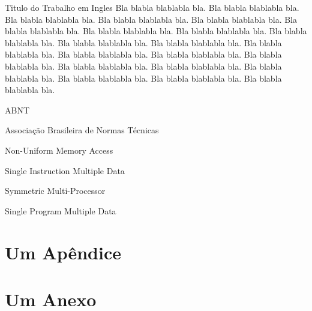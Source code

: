 \documentclass[tese,capa]{texufpel}
\begin{document}
\begin{englishabstract}{Titulo do Trabalho em Ingles}
Bla blabla blablabla bla.  Bla blabla blablabla bla.  Bla blabla
blablabla bla.  Bla blabla blablabla bla.  Bla blabla blablabla bla.
Bla blabla blablabla bla.  Bla blabla blablabla bla.  Bla blabla
blablabla bla.  Bla blabla blablabla bla.  Bla blabla blablabla bla.
Bla blabla blablabla bla.  Bla blabla blablabla bla.  Bla blabla
blablabla bla.  Bla blabla blablabla bla.  Bla blabla blablabla bla.
Bla blabla blablabla bla.  Bla blabla blablabla bla.  Bla blabla
blablabla bla.  Bla blabla blablabla bla.  Bla blabla blablabla bla.
Bla blabla blablabla bla.
\end{englishabstract}

\listoffigures

\listoftables

\begin{listofabbrv}{ABNT}%
        \item[ABNT] Associação Brasileira de Normas Técnicas
        \item[NUMA] Non-Uniform Memory Access
        \item[SIMD] Single Instruction Multiple Data
        \item[SMP] Symmetric Multi-Processor
        \item[SPMD] Single Program Multiple Data
\end{listofabbrv}

\tableofcontents



 

\apendices
\chapter{Um Apêndice}

\anexos
\chapter{Um Anexo}
\end{document}
